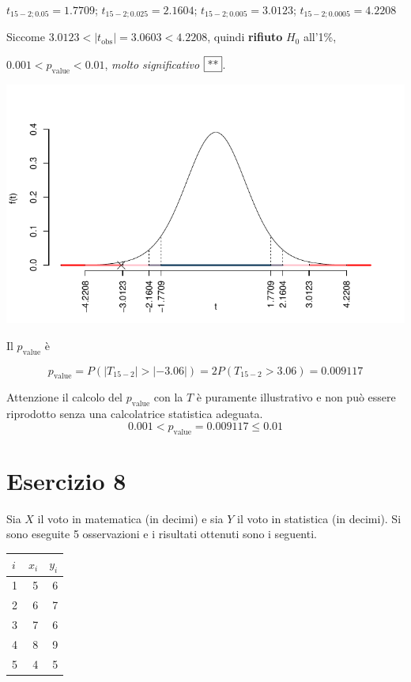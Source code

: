 \documentclass[
  11pt,
]{book}
\theoremstyle{mytheoremstyle}
\theoremstyle{mydefstyle}
\newenvironment{sol}
  {
  \begin{tcolorbox}[enhanced,breakable,arc=0.1mm,boxrule=1pt,colback=white,colframe=iblue,
  title=\bf \fontfamily{lmss}\selectfont \hspace{.5 cm} Soluzione,drop fuzzy shadow]

}{
\end{tcolorbox}
  }
\begin{document}
\begin{sol}
\(t_{15-2;0.05}=1.7709\); \(t_{15-2;0.025}=2.1604\); \(t_{15-2;0.005}=3.0123\); \(t_{15-2;0.0005}=4.2208\)

Siccome \(3.0123<|t_\text{obs}|=3.0603<4.2208\), quindi \textbf{rifiuto} \(H_0\) all'1\%,

\(0.001<p_\text{value}<0.01\), \emph{molto significativo} \(\fbox{**}\).

\begin{center}\includegraphics{Esami_passati_con_soluzioni_files/figure-latex/06-regr-38,-1} \end{center}

Il \(p_{\text{value}}\) è

\[ p_{\text{value}} = P(|T_{15-2}|>|-3.06|)=2P(T_{15-2}>3.06)=0.009117 \]

Attenzione il calcolo del \(p_\text{value}\) con la \(T\) è puramente illustrativo e non può essere riprodotto senza una calcolatrice statistica adeguata.\[
 0.001 < p_\text{value}= 0.009117 \leq 0.01 
\]

\end{sol}

\section{Esercizio 8}\label{esercizio-8}

Sia \(X\) il voto in matematica (in decimi) e sia \(Y\) il voto in
statistica (in decimi).
Si sono eseguite 5 osservazioni e i risultati ottenuti sono i seguenti.

\begin{table}[H]
\centering
\begin{tabular}{lrr}
\toprule
$i$ & $x_i$ & $y_i$\\
\midrule
1 & 5 & 6\\
2 & 6 & 7\\
3 & 7 & 6\\
4 & 8 & 9\\
5 & 4 & 5\\
\bottomrule
\end{tabular}
\end{table}
\end{document}
